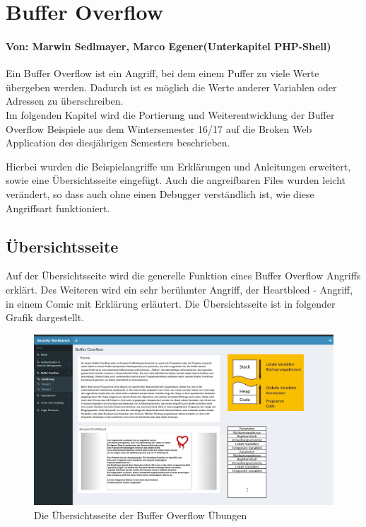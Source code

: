 \chapter{Buffer Overflow}
\subsubsection*{Von: Marwin Sedlmayer, Marco Egener(Unterkapitel PHP-Shell)}
Ein Buffer Overflow ist ein Angriff, bei dem einem Puffer zu viele Werte übergeben werden. Dadurch ist es möglich die Werte anderer Variablen oder Adressen zu überschreiben. \\
Im folgenden Kapitel wird die Portierung und Weiterentwicklung der Buffer Overflow Beispiele aus dem Wintersemester 16/17 auf die Broken Web Application des diesjährigen Semesters beschrieben.

Hierbei wurden die Beispielangriffe um Erklärungen und Anleitungen erweitert, sowie eine Übersichtsseite eingefügt. Auch die angreifbaren Files wurden leicht verändert, so dass auch ohne einen Debugger verständlich ist, wie diese Angriffsart funktioniert.
\section{Übersichtsseite}
Auf der Übersichtsseite wird die generelle Funktion eines Buffer Overflow Angriffs erklärt. Des Weiteren wird ein sehr berühmter Angriff, der Heartbleed - Angriff, in einem Comic mit Erklärung erläutert. Die Übersichtsseite ist in folgender Grafik dargestellt.

\begin{figure}[H]
	\centering
	\includegraphics[width=\textwidth]{images/Bufferoverflow/Uebersichtsseite.PNG}
	\caption{Die Übersichtsseite der Buffer Overflow Übungen}
	\label{fig:BO_Overview}
\end{figure}

